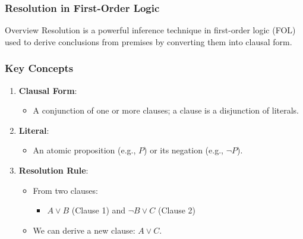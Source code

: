 \documentclass[aspectratio=169]{beamer}
\begin{document}
\begin{frame}[fragile]
    \frametitle{Resolution in First-Order Logic}
    \begin{block}{Overview}
        Resolution is a powerful inference technique in first-order logic (FOL) used to derive conclusions from premises by converting them into clausal form.
    \end{block}
\end{frame}

\begin{frame}[fragile]
    \frametitle{Key Concepts}
    \begin{enumerate}
        \item \textbf{Clausal Form}:
        \begin{itemize}
            \item A conjunction of one or more clauses; a clause is a disjunction of literals.
        \end{itemize}
        
        \item \textbf{Literal}:
        \begin{itemize}
            \item An atomic proposition (e.g., $P$) or its negation (e.g., $\neg P$).
        \end{itemize}
        
        \item \textbf{Resolution Rule}:
        \begin{itemize}
            \item From two clauses:
            \begin{itemize}
                \item $A \lor B$ (Clause 1) and $¬B \lor C$ (Clause 2)
            \end{itemize}
            \item We can derive a new clause: $A \lor C$.
        \end{itemize}
    \end{enumerate}
\end{frame}
\end{document}
